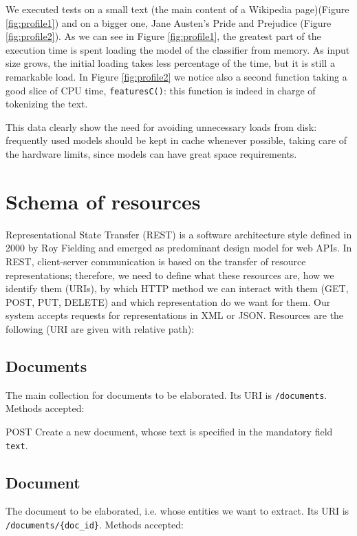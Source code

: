 \documentclass[a4paper,11pt]{report}
\begin{document}
We executed tests on a small text (the main content of a Wikipedia page)(Figure \ref{fig:profile1}) and on a bigger one, Jane Austen's Pride and Prejudice (Figure \ref{fig:profile2}).
As we can see in Figure \ref{fig:profile1}, the greatest part of the execution time is spent loading the model of the classifier from memory. As input size grows, the initial loading takes less percentage of the time, but it is still a remarkable load. In Figure \ref{fig:profile2} we notice also a second function taking a good slice of CPU time, \texttt{featuresC()}: this function is indeed in charge of tokenizing the text.

This data clearly show the need for avoiding unnecessary loads from disk: frequently used models should be kept in cache whenever possible, taking care of the hardware limits, since models can have great space requirements.

\section{Schema of resources}
Representational State Transfer (REST) is a software architecture style defined in 2000 by Roy Fielding and emerged as predominant design model for web APIs. %
In REST, client-server communication is based on the transfer of resource representations; therefore, we need to define what these resources are, how we identify them (URIs), by which HTTP method we can interact with them (GET, POST, PUT, DELETE) and which representation do we want for them.
Our system accepts requests for representations in XML or JSON.
Resources are the following (URI are given with relative path):
\subsection*{Documents}
The main collection for documents to be elaborated. Its URI is \texttt{/documents}.
Methods accepted:

\begin{description}
\item{POST} Create a new document, whose text is specified in the mandatory field \texttt{text}.
\end{description}

\subsection*{Document}
The document to be elaborated, i.e. whose entities we want to extract. Its URI is \texttt{/documents/\{doc\_id\}}.
Methods accepted:
\end{document}
